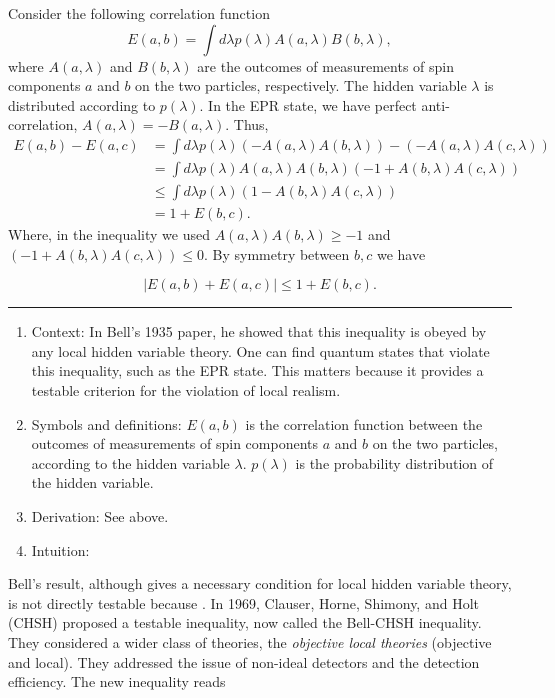 Consider the following correlation function
\[
E(a, b)=\int d \lambda p(\lambda) A(a, \lambda) B(b, \lambda),
\]
where $A(a, \lambda)$ and $B(b, \lambda)$ are the outcomes of measurements of spin components $a$ and $b$ on the two particles, respectively. The hidden variable $\lambda$ is distributed according to $p(\lambda)$. In the EPR state, we have perfect anti-correlation, $A(a, \lambda) = - B(a, \lambda)$. Thus,
\begin{align*}
    E(a,b) - E(a, c) 
    &= \int d \lambda p(\lambda) (- A(a, \lambda) A(b, \lambda)) - (- A(a, \lambda) A(c, \lambda)) \\
    &= \int d \lambda p(\lambda) A(a, \lambda) A(b, \lambda) (-1 + A(b, \lambda) A(c, \lambda)) \\
    &\leq \int d \lambda p(\lambda) (1 - A(b, \lambda) A(c, \lambda)) \\
    &= 1 + E(b, c).
\end{align*}
Where, in the inequality we used $A(a, \lambda) A(b, \lambda) \geq -1$ and $(-1 + A(b, \lambda) A(c, \lambda)) \leq 0$. By symmetry between $b, c$ we have

\begin{tcolorbox}[breakable,colback=cyan!10,title=Bell's Inequality]
    \[
|E(a, b)+E(a, c)| \leq 1+E(b, c)
    .\]
    \rule{\linewidth}{0.1em}
    \begin{enumerate}[leftmargin=!,labelindent=!,itemindent=-15pt]
        \item Context: In Bell's 1935 paper, he showed that this inequality is obeyed by any local hidden variable theory. One can find quantum states that violate this inequality, such as the EPR state. This matters because it provides a testable criterion for the violation of local realism.
        \item Symbols and definitions: $E(a,b)$ is the correlation function between the outcomes of measurements of spin components $a$ and $b$ on the two particles, according to the hidden variable $\lambda$. $p(\lambda)$ is the probability distribution of the hidden variable.
        \item Derivation: See above.
        \item Intuition:
    \end{enumerate}
\end{tcolorbox}

Bell's result, although gives a necessary condition for local hidden variable theory, is not directly testable because . In 1969, Clauser, Horne, Shimony, and Holt (CHSH) \autocite{clauserProposedExperiment1969,clauserExperimentalConsequences1974} proposed a testable inequality, now called the Bell-CHSH inequality. They considered a wider class of theories, the \textit{objective local theories} (objective and local).
They addressed the issue of non-ideal detectors and the detection efficiency. The new inequality reads

